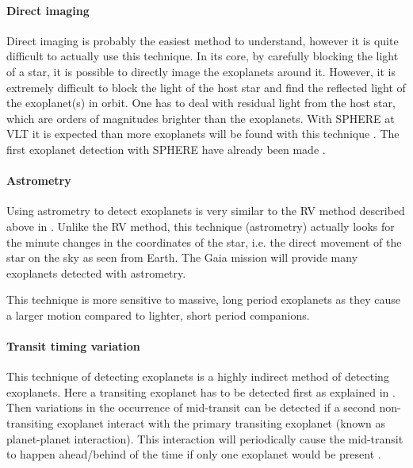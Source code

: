 \paragraph{Direct imaging}

Direct imaging is probably the easiest method to understand, however it is quite difficult to
actually use this technique. In its core, by carefully blocking the light of a star, it is possible
to directly image the exoplanets around it. However, it is extremely difficult to block the light of
the host star and find the reflected light of the exoplanet(s) in orbit. One has to deal with
residual light from the host star, which are orders of magnitudes brighter than the exoplanets. With
SPHERE at VLT it is expected than more exoplanets will be found with this technique
\citep{Beuzit2008}. The first exoplanet detection with SPHERE have already been made \citep[see
e.g.]{Vigan2016,Bonnefoy2016,Apai2016,Maire2016,Zurlo2016}.


\paragraph{Astrometry}

Using astrometry to detect exoplanets is very similar to the RV method described above in
. Unlike the RV method, this technique (astrometry) actually looks for the minute
changes in the coordinates of the star, i.e. the direct movement of the star on the sky as seen from
Earth. The Gaia mission \citep{GAIA} will provide many exoplanets detected with astrometry.

This technique is more sensitive to massive, long period exoplanets as they cause a larger motion
compared to lighter, short period companions.


\paragraph{Transit timing variation}

This technique of detecting exoplanets is a highly indirect method of detecting exoplanets. Here a
transiting exoplanet has to be detected first as explained in . Then
variations in the occurrence of mid-transit can be detected if a second non-transiting exoplanet
interact with the primary transiting exoplanet (known as planet-planet interaction). This
interaction will periodically cause the mid-transit to happen ahead/behind of the time if only one
exoplanet would be present \citep{Agol2005,Holman2005}.

